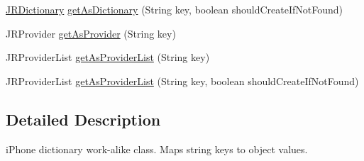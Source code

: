 \begin{DoxyCompactItemize}
\item 
\hyperlink{classcom_1_1janrain_1_1android_1_1engage_1_1types_1_1_j_r_dictionary}{JRDictionary} \hyperlink{classcom_1_1janrain_1_1android_1_1engage_1_1types_1_1_j_r_dictionary_a242038f2624c2d7e3ec0054f4dfc00cb}{getAsDictionary} (String key, boolean shouldCreateIfNotFound)
\item 
JRProvider \hyperlink{classcom_1_1janrain_1_1android_1_1engage_1_1types_1_1_j_r_dictionary_a2c6e1b2508f07fcc741f2bbadd172e27}{getAsProvider} (String key)
\item 
JRProviderList \hyperlink{classcom_1_1janrain_1_1android_1_1engage_1_1types_1_1_j_r_dictionary_a6d9438328f9f120ec870ac0ab3a1dc54}{getAsProviderList} (String key)
\item 
JRProviderList \hyperlink{classcom_1_1janrain_1_1android_1_1engage_1_1types_1_1_j_r_dictionary_a046a199ec28d45d39b125fffe231183f}{getAsProviderList} (String key, boolean shouldCreateIfNotFound)
\end{DoxyCompactItemize}


\subsection{Detailed Description}
iPhone dictionary work-\/alike class. Maps string keys to object values. 

